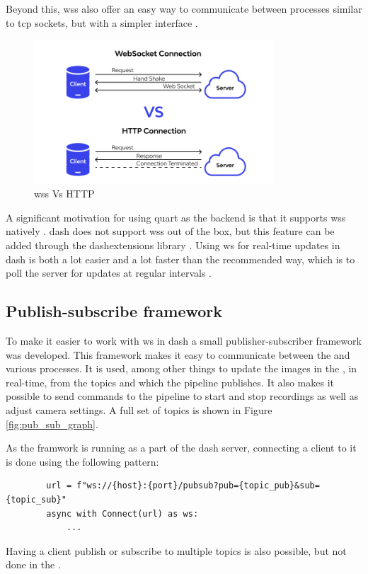Beyond this, \glspl{ws} also offer an easy way to communicate between processes similar to \gls{tcp} sockets, but with a simpler interface \cite{kanakaAnswerDifferencesTCP2013}.
\begin{figure}[H]
    \centering
    \includegraphics[width=0.8\textwidth]{figures/gui/http_vs_ws.png}
    \caption{\glspl{ws} Vs HTTP \cite{wallarmWebSocketVsHTTP}}
    \label{fig:websockets_vs_http}
\end{figure}

A significant motivation for using \gls{quart} as the backend is that it supports \glspl{ws} natively \cite{quartUsingWebsocketsQuart}.
\gls{dash} does not support \glspl{ws} out of the box, but this feature can be added through the \gls{dashextensions} library \cite{eriksenDashExtensionsWebSocket}.
Using \gls{ws} for real-time updates in \gls{dash} is both a lot easier and a lot faster than the recommended way, which is to poll the server for updates at regular intervals \cite{plotlyLiveUpdatesDash}.

\subsection{Publish-subscribe framework}
\label{sec:pubsub}
To make it easier to work with \gls{ws} in \gls{dash} a small publisher-subscriber framework was developed.
This framework makes it easy to communicate between the \srgui and various processes.
It is used, among other things to update the images in the \srgui, in real-time, from the topics  and  which the \gls{pipeline} publishes.
It also makes it possible to send commands to the \gls{pipeline} to start and stop recordings as well as adjust camera settings.
A full set of topics is shown in Figure \ref{fig:pub_sub_graph}.

As the framwork is running as a part of the \gls{dash} server, connecting a client to it is done using the following pattern:
\begin{verbatim}
        url = f"ws://{host}:{port}/pubsub?pub={topic_pub}&sub={topic_sub}"
        async with Connect(url) as ws:
            ...
\end{verbatim}
Having a client publish or subscribe to multiple topics is also possible, but not done in the \srgui.


